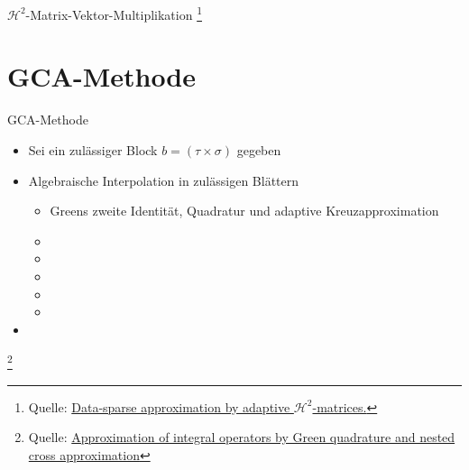 \documentclass[10pt]{beamer}
\let\svthefootnote\thefootnote
\begin{document}
\begin{frame}{\(\mathcal{H}^2\)-Matrix-Vektor-Multiplikation}
  \footnotesize
  \let\thefootnote\relax\footnote{Quelle: \href{https://link.springer.com/article/10.1007\%2Fs00607-002-1450-4?LI=true}{Data-sparse approximation by adaptive \(\mathcal{H}^2\)-matrices.}}
  \addtocounter{footnote}{-1}\let\thefootnote\svthefootnote\relax
  \normalsize
\end{frame}

\section{GCA-Methode}

\begin{frame}{GCA-Methode}
  \begin{itemize}
    \item Sei ein zulässiger Block \(b = (\tau \times \sigma)\) gegeben
    \item Algebraische Interpolation in zulässigen Blättern
    \begin{itemize}
      \item Greens zweite Identität, Quadratur und adaptive Kreuzapproximation
      \item {}
      \item {}
      \item {}
      \item {}
      \item {}
    \end{itemize}
    \item {}
  \end{itemize}

  \footnotesize
  \let\thefootnote\relax\footnote{Quelle: \href{https://link.springer.com/article/10.1007\%2Fs00211-015-0757-y}{Approximation of integral operators by Green quadrature and nested cross approximation}}
  \addtocounter{footnote}{-1}\let\thefootnote\svthefootnote\relax
  \normalsize
\end{frame}
\end{document}
